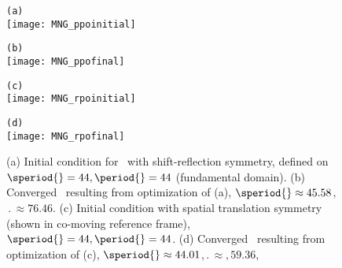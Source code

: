 \begin{figure}
\begin{minipage}[height=.05\textheight]{.5\textwidth}
\centering
\small{\texttt{(a)}} \\
\texttt{[image: MNG\_ppoinitial]}
\end{minipage}
\begin{minipage}[height=.2\textheight]{.5\textwidth}
\centering
\small{\texttt{(b)}} \\
\texttt{[image: MNG\_ppofinal]}
\end{minipage}
\begin{minipage}[height=.2\textheight]{.5\textwidth}
\centering
\small{\texttt{(c)}} \\
\texttt{[image: MNG\_rpoinitial]}
\end{minipage}
\begin{minipage}[height=.2\textheight]{.5\textwidth}
\centering
\small{\texttt{(d)}} \\
\texttt{[image: MNG\_rpofinal]}
\end{minipage}
\caption{ \label{fig:KStrawl}
(a) Initial condition for \twot\ with shift-reflection symmetry, defined on
$\speriod{}=44,\period{}=44$ (fundamental domain). (b) Converged \twot\
resulting from optimization of (a), $\speriod{}\approx 45.58$,$\period{}\approx 76.46$.
(c) Initial condition with spatial translation symmetry (shown in co-moving reference frame),
$\speriod{}=44,\period{}=44$. (d) Converged \twot\ resulting from optimization
of (c), $\speriod{}\approx 44.01$,$\period{}\approx,59.36$,}
\end{figure}

